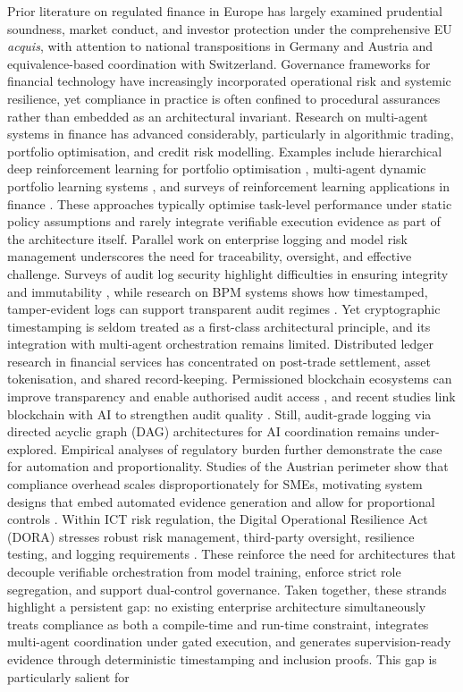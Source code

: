 \documentclass[oneside,10pt]{swissi}
\begin{document}
Prior literature on regulated finance in Europe has largely examined prudential soundness, market conduct, and investor protection under the comprehensive EU \emph{acquis}, with attention to national transpositions in Germany and Austria and equivalence-based coordination with Switzerland. Governance frameworks for financial technology have increasingly incorporated operational risk and systemic resilience, yet compliance in practice is often confined to procedural assurances rather than embedded as an architectural invariant. Research on multi-agent systems in finance has advanced considerably, particularly in algorithmic trading, portfolio optimisation, and credit risk modelling. Examples include hierarchical deep reinforcement learning for portfolio optimisation \cite{Sun2025MultiAgentHDRL}, multi-agent dynamic portfolio learning systems \cite{Cheng2024MultiagentRL}, and surveys of reinforcement learning applications in finance \cite{Hambly2021RLFinance,Malibari2023RLFintech}.  These approaches typically optimise task-level performance under static policy assumptions and rarely integrate verifiable execution evidence as part of the architecture itself. Parallel work on enterprise logging and model risk management underscores the need for traceability, oversight, and effective challenge. Surveys of audit log security highlight difficulties in ensuring integrity and immutability \cite{Ali2021AuditLogSurvey}, while research on BPM systems shows how timestamped, tamper-evident logs can support transparent audit regimes \cite{IJITMIS2025BPMAudit}. Yet cryptographic timestamping is seldom treated as a first-class architectural principle, and its integration with multi-agent orchestration remains limited. Distributed ledger research in financial services has concentrated on post-trade settlement, asset tokenisation, and shared record-keeping. Permissioned blockchain ecosystems can improve transparency and enable authorised audit access \cite{Faccia2022PermissionedAudit}, and recent studies link blockchain with AI to strengthen audit quality \cite{Arham2025AIBlockchainAudit}. Still, audit-grade logging via directed acyclic graph (DAG) architectures for AI coordination remains under-explored. Empirical analyses of regulatory burden further demonstrate the case for automation and proportionality. Studies of the Austrian perimeter show that compliance overhead scales disproportionately for SMEs, motivating system designs that embed automated evidence generation and allow for proportional controls \cite{Kurz2025FMAAustria}. Within ICT risk regulation, the Digital Operational Resilience Act (DORA) stresses robust risk management, third-party oversight, resilience testing, and logging requirements \cite{DORA_EIOPA2025,DORA_Skadden2024,EBA_RTS2024}. These reinforce the need for architectures that decouple verifiable orchestration from model training, enforce strict role segregation, and support dual-control governance. Taken together, these strands highlight a persistent gap: no existing enterprise architecture simultaneously treats compliance as both a compile-time and run-time constraint, integrates multi-agent coordination under gated execution, and generates supervision-ready evidence through deterministic timestamping and inclusion proofs. This gap is particularly salient for 
\end{document}
